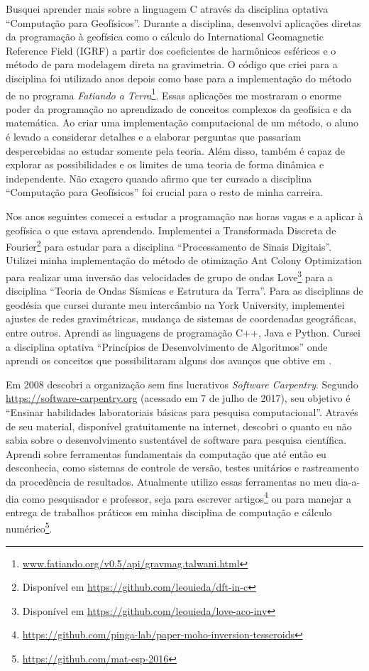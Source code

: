Busquei aprender mais sobre a linguagem C através da disciplina optativa
``Computação para Geofísicos''.
Durante a disciplina, desenvolvi aplicações diretas da programação à geofísica
como o cálculo do International Geomagnetic Reference Field (IGRF) a partir dos
coeficientes de harmônicos esféricos e o método de \citet{talwani1959} para
modelagem direta na gravimetria.
O código que criei para a disciplina foi utilizado anos depois como base
para a implementação do método de \citet{talwani1959} no programa
\textit{Fatiando a
Terra}\footnote{\url{www.fatiando.org/v0.5/api/gravmag.talwani.html}}.
Essas aplicações me mostraram o enorme poder da programação no aprendizado de
conceitos complexos da geofísica e da matemática.
Ao criar uma implementação computacional de um método, o aluno é levado a
considerar detalhes e a elaborar perguntas que passariam despercebidas ao
estudar somente pela teoria.
Além disso, também é capaz de explorar as possibilidades e os limites de uma
teoria de forma dinâmica e independente.
Não exagero quando afirmo que ter cursado a disciplina ``Computação para
Geofísicos'' foi crucial para o resto de minha carreira.

Nos anos seguintes comecei a estudar a programação nas horas vagas e a aplicar
à geofísica o que estava aprendendo.
Implementei a Transformada Discreta de Fourier\footnote{Disponível em
\url{https://github.com/leouieda/dft-in-c}} para estudar para a disciplina
``Processamento de Sinais Digitais''.
Utilizei minha implementação do método de otimização Ant Colony Optimization
\citep{socha2008} para realizar uma inversão das velocidades de grupo de ondas
Love\footnote{Disponível em \url{https://github.com/leouieda/love-aco-inv}}
para a disciplina ``Teoria de Ondas Sísmicas e Estrutura da Terra''.
Para as disciplinas de geodésia que cursei durante meu intercâmbio na York
University, implementei ajustes de redes gravimétricas, mudança de sistemas de
coordenadas geográficas, entre outros.
Aprendi as linguagens de programação C++, Java e Python.
Cursei a disciplina optativa ``Princípios de Desenvolvimento de Algoritmos''
onde aprendi os conceitos que possibilitaram alguns dos avanços que obtive em
\citet{tesseroids}.

Em 2008 descobri a organização sem fins lucrativos \textit{Software Carpentry}.
Segundo \url{https://software-carpentry.org} (acessado em 7 de julho de 2017),
seu objetivo é ``Ensinar habilidades laboratoriais básicas para pesquisa
computacional''.
Através de seu material, disponível gratuitamente na internet, descobri o
quanto eu não sabia sobre o desenvolvimento sustentável de software para
pesquisa científica.
Aprendi sobre ferramentas fundamentais da computação que até então eu
desconhecia, como sistemas de controle de versão, testes unitários e
rastreamento da procedência de resultados.
Atualmente utilizo essas ferramentas no meu dia-a-dia como pesquisador e
professor, seja para escrever
artigos\footnote{\url{https://github.com/pinga-lab/paper-moho-inversion-tesseroids}}
ou para manejar a entrega de trabalhos práticos em minha disciplina de
computação e cálculo numérico\footnote{\url{https://github.com/mat-esp-2016}}.

